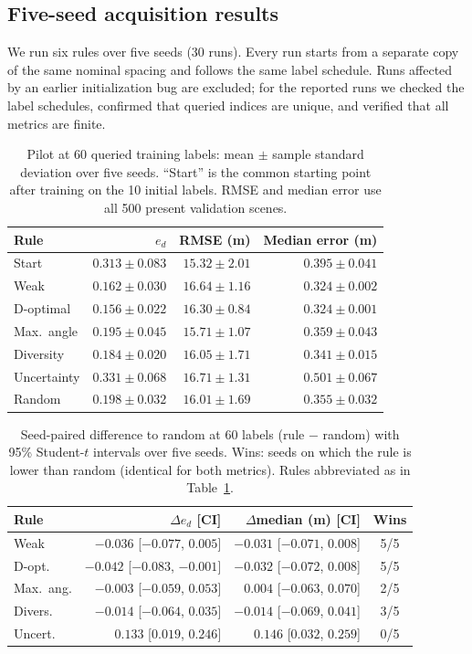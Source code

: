 \documentclass[conference]{IEEEtran}
\begin{document}
\subsection{Five-seed acquisition results}
We run six rules over five seeds (30 runs). Every run starts from a separate copy of the same nominal spacing and follows the same label schedule. Runs affected by an earlier initialization bug are excluded; for the reported runs we checked the label schedules, confirmed that queried indices are unique, and verified that all metrics are finite.

\begin{table}[t]\centering\small
\caption{Pilot at 60 queried training labels: mean $\pm$ sample standard deviation over five seeds. ``Start'' is the common starting point after training on the 10 initial labels. RMSE and median error use all 500 present validation scenes.}\label{tab:active}
\setlength{\tabcolsep}{3pt}
\begin{tabular}{lrrr}\toprule
Rule & $e_d$ & RMSE (m) & Median error (m)\\\midrule
Start & $0.313\pm0.083$ & $15.32\pm2.01$ & $0.395\pm0.041$\\\midrule
Weak & $0.162\pm0.030$ & $16.64\pm1.16$ & $0.324\pm0.002$\\
D-optimal & $\mathbf{0.156}\pm0.022$ & $16.30\pm0.84$ & $\mathbf{0.324}\pm0.001$\\
Max.\ angle & $0.195\pm0.045$ & $\mathbf{15.71}\pm1.07$ & $0.359\pm0.043$\\
Diversity & $0.184\pm0.020$ & $16.05\pm1.71$ & $0.341\pm0.015$\\
Uncertainty & $0.331\pm0.068$ & $16.71\pm1.31$ & $0.501\pm0.067$\\
Random & $0.198\pm0.032$ & $16.01\pm1.69$ & $0.355\pm0.032$\\\bottomrule
\end{tabular}
\end{table}

\begin{table}[t]\centering\small
\caption{Seed-paired difference to random at 60 labels (rule $-$ random) with 95\% Student-$t$ intervals over five seeds. Wins: seeds on which the rule is lower than random (identical for both metrics). Rules abbreviated as in Table~\ref{tab:active}.}\label{tab:paired}
\setlength{\tabcolsep}{2pt}\footnotesize
\begin{tabular}{lrrc}\toprule
Rule & $\Delta e_d$ [CI] & $\Delta$median (m) [CI] & Wins\\\midrule
Weak & $-0.036$ [$-0.077$, $0.005$] & $-0.031$ [$-0.071$, $0.008$] & 5/5\\
D-opt. & $-0.042$ [$-0.083$, $-0.001$] & $-0.032$ [$-0.072$, $0.008$] & 5/5\\
Max.\ ang. & $-0.003$ [$-0.059$, $0.053$] & $0.004$ [$-0.063$, $0.070$] & 2/5\\
Divers. & $-0.014$ [$-0.064$, $0.035$] & $-0.014$ [$-0.069$, $0.041$] & 3/5\\
Uncert. & $0.133$ [$0.019$, $0.246$] & $0.146$ [$0.032$, $0.259$] & 0/5\\\bottomrule
\end{tabular}
\end{table}
\end{document}
